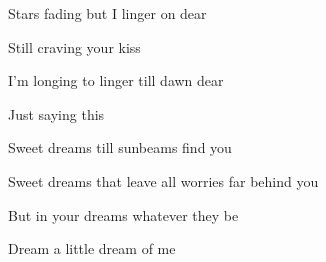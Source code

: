 \begin{song}
\bigskip

 Stars fading but I linger on dear \par
{} Still craving your kiss  \par
{} I'm longing to linger till dawn dear \par
{} Just saying this  \par

\bigskip

 Sweet dreams till sunbeams  find you \par
{}Sweet dreams that leave all worries far behind you \par
{} But in your dreams whatever they be \par
{}Dream a little dream of me \par

\end{song}
